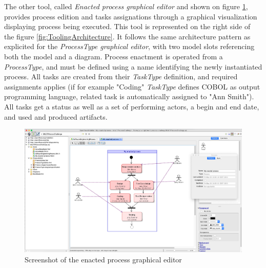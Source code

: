 The other tool, called \textit{Enacted process graphical editor} and shown on figure \ref{fig:ScreenshotEnactedProcessEditor}, provides process edition and tasks assignations through a graphical visualization displaying process being executed. This tool is represented on the right side of the figure \ref{fig:ToolingArchitecture}. It follows the same architecture pattern as explicited for the \textit{ProcessType graphical editor}, with two model slots referencing both the model and a diagram. Process enactment is operated from a \textit{ProcessType}, and must be defined using a name identifying the newly instantiated process. All tasks are created from their \textit{TaskType} definition, and required assignments applies (if for example "Coding" \textit{TaskType} defines COBOL as output programming language, related task is automatically assigned to "Ann Smith"). All tasks get a status as well as a set of performing actors, a begin and end date, and used and produced artifacts. 

\begin{figure}
 \centering
     \includegraphics[width=1.0 \textwidth]{Figures/ScreenshotEnactedProcessEditor.png}
     \caption{Screenshot of the enacted process graphical editor}
    \label{fig:ScreenshotEnactedProcessEditor}
\end{figure}




